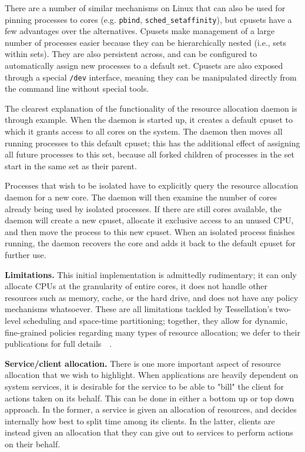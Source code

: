 \documentclass[letterpaper,twocolumn,11pt]{article}
\begin{document}
There are a number of similar mechanisms on Linux that can also be used for pinning processes to cores (e.g. {\tt pbind}, {\tt sched\_setaffinity}), but cpusets have a few advantages over the alternatives. Cpusets make management of a large number of processes easier because they can be hierarchically nested (i.e., sets within sets). They are also persistent across, and can be configured to automatically assign new processes to a default set. Cpusets are also exposed through a special {\tt /dev} interface, meaning they can be manipulated directly from the command line without special tools.

The clearest explanation of the functionality of the resource allocation daemon is through example. When the daemon is started up, it creates a default cpuset to which it grants access to all cores on the system. The daemon then moves all running processes to this default cpuset; this has the additional effect of assigning all future processes to this set, because all forked children of processes in the set start in the same set as their parent.

Processes that wish to be isolated have to explicitly query the resource allocation daemon for a new core. The daemon will then examine the number of cores already being used by isolated processes. If there are still cores available, the daemon will create a new cpuset, allocate it exclusive access to an unused CPU, and then move the process to this new cpuset. When an isolated process finishes running, the daemon recovers the core and adds it back to the default cpuset for further use.

\textbf{Limitations.} This initial implementation is admittedly rudimentary; it can only allocate CPUs at the granularity of entire cores, it does not handle other resources such as memory, cache, or the hard drive, and does not have any policy mechanisms whatsoever. These are all limitations tackled by Tessellation's two-level scheduling and space-time partitioning; together, they allow for dynamic, fine-grained policies regarding many types of resource allocation; we defer to their publications for full details~\cite{liu09tessellation}~\cite{tessellation-hotpar10}.

\textbf{Service/client allocation.} There is one more important aspect of resource allocation that we wish to highlight. When applications are heavily dependent on system services, it is desirable for the service to be able to "bill" the client for actions taken on its behalf. This can be done in either a bottom up or top down approach. In the former, a service is given an allocation of resources, and decides internally how best to split time among its clients. In the latter, clients are instead given an allocation that they can give out to services to perform actions on their behalf.
\end{document}
